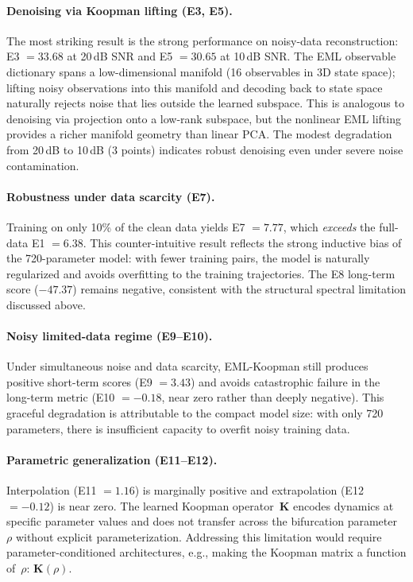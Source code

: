 \documentclass[11pt]{article}
\newcommand{\bK}{\mathbf{K}}
\begin{document}
\paragraph{Denoising via Koopman lifting (E3, E5).}
The most striking result is the strong performance on noisy-data reconstruction:
E3 $= 33.68$ at 20\,dB SNR and E5 $= 30.65$ at 10\,dB SNR.  The EML observable
dictionary spans a low-dimensional manifold (16 observables in 3D state space);
lifting noisy observations into this manifold and decoding back to state space
naturally rejects noise that lies outside the learned subspace.  This is
analogous to denoising via projection onto a low-rank subspace, but the
nonlinear EML lifting provides a richer manifold geometry than linear PCA.
The modest degradation from 20\,dB to 10\,dB (3 points) indicates robust
denoising even under severe noise contamination.

\paragraph{Robustness under data scarcity (E7).}
Training on only 10\% of the clean data yields E7 $= 7.77$, which
\emph{exceeds} the full-data E1 $= 6.38$.  This counter-intuitive result
reflects the strong inductive bias of the 720-parameter model: with fewer
training pairs, the model is naturally regularized and avoids overfitting to
the training trajectories.  The E8 long-term score ($-47.37$) remains negative,
consistent with the structural spectral limitation discussed above.

\paragraph{Noisy limited-data regime (E9--E10).}
Under simultaneous noise and data scarcity, EML-Koopman still produces positive
short-term scores (E9 $= 3.43$) and avoids catastrophic failure in the
long-term metric (E10 $= -0.18$, near zero rather than deeply negative).
This graceful degradation is attributable to the compact model size: with only
720 parameters, there is insufficient capacity to overfit noisy training data.

\paragraph{Parametric generalization (E11--E12).}
Interpolation (E11 $= 1.16$) is marginally positive and extrapolation
(E12 $= -0.12$) is near zero.  The learned Koopman operator~$\bK$ encodes
dynamics at specific parameter values and does not transfer across the
bifurcation parameter~$\rho$ without explicit parameterization.  Addressing
this limitation would require parameter-conditioned architectures, e.g.,
making the Koopman matrix a function of~$\rho$: $\bK(\rho)$.
\end{document}
